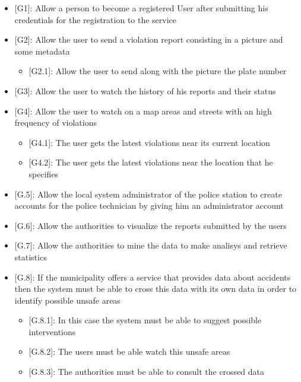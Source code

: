 \begin{itemize}
  \item {[G1]}: Allow a person to become a registered User after submitting his credentials for the registration to the service
  \item {[G2]}: Allow the user to send a violation report consisting in a picture and some metadata
    \begin{itemize}
      \item {[G2.1]}: Allow the user to send along with the picture the plate number
    \end{itemize}
  \item {[G3]}: Allow the user to watch the history of his reports and their status
  \item {[G4]}: Allow the user to watch on a map areas and streets with an high frequency of violations
  \begin{itemize}
    \item {[G4.1]}: The user gets the latest violations near its current location 
    \item {[G4.2]}: The user gets the latest violations near the location that he specifies
  \end{itemize} 
  \item {[G.5]}: Allow the local system administrator of the police station to create accounts for the police technician by giving him an administrator account
  \item {[G.6]}: Allow the authorities to visualize the reports submitted by the users
  \item {[G.7]}: Allow the authorities to mine the data to make analisys and retrieve statistics
  \item {[G.8]}: If the municipality offers a service that provides data about accidents then the system must be able to cross this data with its own data in order to identify possible unsafe areas
  \begin{itemize}
    \item {[G.8.1]}: In this case the system must be able to suggest possible interventions
    \item {[G.8.2]}: The users must be able  watch this unsafe areas
    \item {[G.8.3]}: The authorities must be able to consult the crossed data
  \end{itemize} 
\end{itemize}
